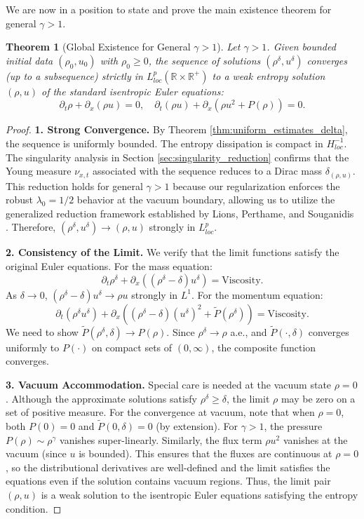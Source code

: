 \documentclass[12pt, reqno]{article}
\newtheorem{theorem}{Theorem}[section]
\theoremstyle{definition}
\newcommand{\pa}{\partial}
\numberwithin{equation}{section}
\begin{document}
We are now in a position to state and prove the main existence theorem for general $\gamma > 1$.

\begin{theorem}[Global Existence for General $\gamma > 1$]
\label{thm:general_gamma_existence}
Let $\gamma > 1$. Given bounded initial data $(\rho_0, u_0)$ with $\rho_0 \ge 0$, the sequence of solutions $(\rho^\delta, u^\delta)$ converges (up to a subsequence) strictly in $L^p_{loc}(\mathbb{R} \times \mathbb{R}^+)$ to a weak entropy solution $(\rho, u)$ of the standard isentropic Euler equations:
\begin{equation}
    \pa_t \rho + \pa_x (\rho u) = 0, \quad \pa_t (\rho u) + \pa_x (\rho u^2 + P(\rho)) = 0.
\end{equation}
\end{theorem}

\begin{proof}
\textbf{1. Strong Convergence.}
By Theorem \ref{thm:uniform_estimates_delta}, the sequence is uniformly bounded. The entropy dissipation is compact in $H^{-1}_{loc}$.
The singularity analysis in Section \ref{sec:singularity_reduction} confirms that the Young measure $\nu_{x,t}$ associated with the sequence reduces to a Dirac mass $\delta_{(\rho, u)}$.
This reduction holds for general $\gamma > 1$ because our regularization enforces the robust $\lambda_0=1/2$ behavior at the vacuum boundary, allowing us to utilize the generalized reduction framework established by Lions, Perthame, and Souganidis \cite{Lions1996}.
Therefore, $(\rho^\delta, u^\delta) \to (\rho, u)$ strongly in $L^p_{loc}$.

\textbf{2. Consistency of the Limit.}
We verify that the limit functions satisfy the original Euler equations.
For the mass equation:
\[
    \pa_t \rho^\delta + \pa_x ((\rho^\delta - \delta)u^\delta) = \text{Viscosity}.
\]
As $\delta \to 0$, $(\rho^\delta - \delta)u^\delta \to \rho u$ strongly in $L^1$.
For the momentum equation:
\[
    \pa_t (\rho^\delta u^\delta) + \pa_x ((\rho^\delta - \delta)(u^\delta)^2 + \tilde{P}(\rho^\delta)) = \text{Viscosity}.
\]
We need to show $\tilde{P}(\rho^\delta, \delta) \to P(\rho)$. Since $\rho^\delta \to \rho$ a.e., and $\tilde{P}(\cdot, \delta)$ converges uniformly to $P(\cdot)$ on compact sets of $(0, \infty)$, the composite function converges.

\textbf{3. Vacuum Accommodation.}
Special care is needed at the vacuum state $\rho=0$. Although the approximate solutions satisfy $\rho^\delta \ge \delta$, the limit $\rho$ may be zero on a set of positive measure.
For the convergence at vacuum, note that when $\rho=0$, both $P(0)=0$ and $\tilde{P}(0,\delta)=0$ (by extension). For $\gamma > 1$, the pressure $P(\rho) \sim \rho^\gamma$ vanishes super-linearly. Similarly, the flux term $\rho u^2$ vanishes at the vacuum (since $u$ is bounded). This ensures that the fluxes are continuous at $\rho=0$, so the distributional derivatives are well-defined and the limit satisfies the equations even if the solution contains vacuum regions.
Thus, the limit pair $(\rho, u)$ is a weak solution to the isentropic Euler equations satisfying the entropy condition.
\end{proof}
\end{document}
